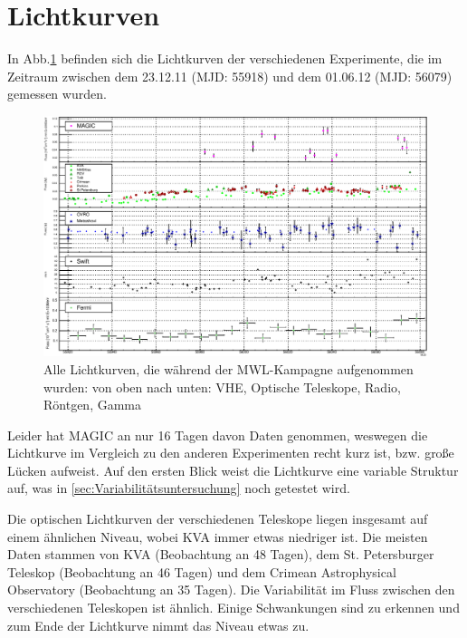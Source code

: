 \section{Lichtkurven}
In Abb.\ref{LC_MWL} befinden sich die Lichtkurven der verschiedenen Experimente, die im Zeitraum zwischen dem 23.12.11 (MJD: 55918) und dem 01.06.12 (MJD: 56079) gemessen wurden.

\begin{figure}
    \centering
    \includegraphics[width=1\linewidth]{./Plots/05_MWL/LC_final.pdf}
    \caption{Alle Lichtkurven, die während der MWL-Kampagne aufgenommen wurden: von oben nach unten: VHE, Optische Teleskope, Radio, Röntgen, Gamma}
    \label{LC_MWL}
\end{figure}

Leider hat MAGIC an nur 16 Tagen davon Daten genommen, weswegen die Lichtkurve im Vergleich zu den anderen Experimenten recht kurz ist, bzw. große Lücken aufweist.
Auf den ersten Blick weist die Lichtkurve eine variable Struktur auf, was in \autoref{sec:Variabilitätsuntersuchung} noch getestet wird.

Die optischen Lichtkurven der verschiedenen Teleskope liegen insgesamt auf einem ähnlichen Niveau, wobei KVA immer etwas niedriger ist.
Die meisten Daten stammen von KVA (Beobachtung an 48 Tagen), dem St. Petersburger Teleskop (Beobachtung an 46 Tagen) und dem Crimean Astrophysical Observatory (Beobachtung an 35 Tagen).
Die Variabilität im Fluss zwischen den verschiedenen Teleskopen ist ähnlich. 
Einige Schwankungen sind zu erkennen und zum Ende der Lichtkurve nimmt das Niveau etwas zu.

